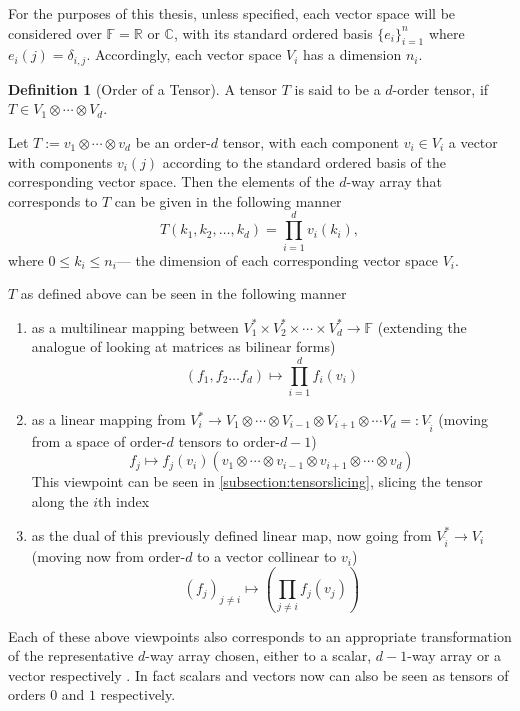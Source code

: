 \documentclass[12pt,a4paper,oneside]{book}
\def\reals{\mathbb{R}} %
\def\complex{\mathbb{C}} %
\def\field{\mathbb{F}} %
\theoremstyle{definition}
\newtheorem{definition}{Definition}[section]
\begin{document}
For the purposes of this thesis, unless specified, each vector space will be considered over $\field = \reals$ or $\complex$, with its standard ordered basis $\{e_i\}_{i=1}^{n}$ where $e_i(j) = \delta_{i,j}$. Accordingly, each vector space $V_i$ has a dimension $n_i$.
\begin{definition}[Order of a Tensor]\label{defn:tensororder}
    A tensor $T$ is said to be a $d$-order tensor, if $T \in V_1 \otimes \cdots\otimes V_d$.
\end{definition}
Let $T := v_1 \otimes \cdots \otimes v_d$ be an order-$d$ tensor, with each component $v_i \in V_i$ a vector with components $v_i(j)$ according to the standard ordered basis of the corresponding vector space. Then the elements of the $d$-way array that corresponds to $T$ can be given in the following manner $$T(k_1, k_2, \ldots, k_d) = \prod_{i=1}^{d} v_i(k_i),$$where $0 \leq k_i \leq n_i$--- the dimension of each corresponding vector space $V_i$.

$T$ as defined above can be seen in the following manner \begin{enumerate}\label{list:viewingtensors}
    \item as a multilinear mapping between $V_1^* \times V_2^* \times \cdots \times V_d^* \to \mathbb{F}$ (extending the analogue of looking at matrices as bilinear forms) $$(f_1, f_2 \ldots f_d) \mapsto \prod_{i=1}^{d} f_i(v_i)$$
    \item as a linear mapping from $V_i^* \to V_1 \otimes \cdots \otimes V_{i-1} \otimes V_{i+1} \otimes \cdots V_d =: V_{\hat{i}}$ (moving from a space of order-$d$ tensors to order-$d-1$) $$f_j \mapsto f_j(v_i)(v_1 \otimes \cdots \otimes v_{i-1}\otimes v_{i+1} \otimes \cdots \otimes v_d)$$This viewpoint can be seen in \cref{subsection:tensorslicing}, slicing the tensor along the $i$th index
    \item as the dual of this previously defined linear map, now going from $V_{\hat{i}}^* \to V_i$ (moving now from order-$d$ to a vector collinear to $v_i$)$$(f_j)_{j \neq i} \mapsto \left(\prod_{j \neq i} f_j(v_j)\right)$$
\end{enumerate}

Each of these above viewpoints also corresponds to an appropriate transformation of the representative $d$-way array chosen, either to a scalar, $d-1$-way array or a vector respectively \cite{landsberg_tensors_2012}. In fact scalars and vectors now can also be seen as tensors of orders $0$ and $1$ respectively. 
\end{document}
